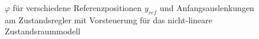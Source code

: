 \begin{figure}[H]
    \centering
    \caption[$\varphi$ für Regler mit Vorsteuerung (nicht-linear)]{$\varphi$ für verschiedene Referenzpositionen $y_{ref}$ und Anfangsauslenkungen am Zustandsregler mit Vorsteuerung für das nicht-lineare Zustandsraummodell}
    \label{fig:Bild33}
\end{figure}

